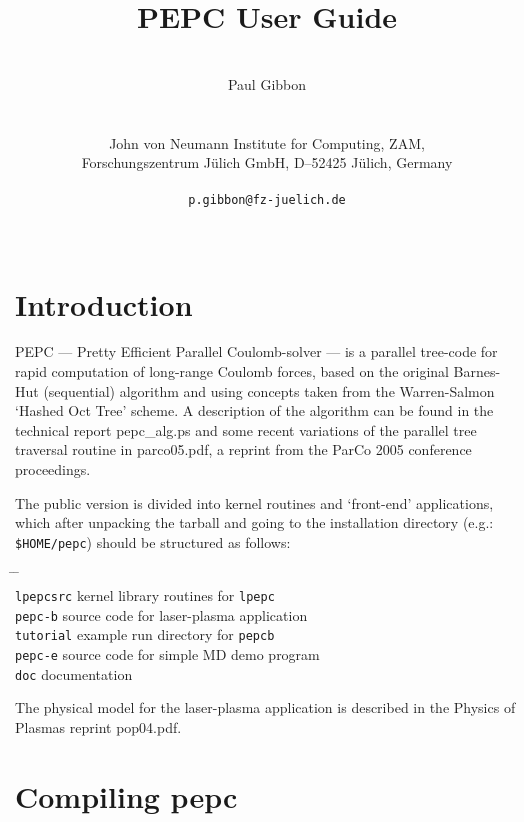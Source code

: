 \documentclass[12pt,psfig]{article}
\title{PEPC User Guide\\}
\author{\\ Paul Gibbon \\ \\ \\
John von Neumann Institute for Computing, ZAM,\\
Forschungszentrum J\"ulich GmbH, D--52425 J\"ulich, Germany\\ \\  {\tt p.gibbon@fz-juelich.de} \\\\
}
\begin{document}
\maketitle
\pagebreak

\begin{tableofcontents}
\end{tableofcontents}

\pagebreak

\section{Introduction}
\normalsize
PEPC --- Pretty Efficient Parallel Coulomb-solver --- is a parallel tree-code 
for rapid computation of long-range Coulomb forces, based on the original
Barnes-Hut (sequential) algorithm and using concepts taken from the
Warren-Salmon `Hashed Oct Tree' scheme.  A description of the algorithm can be
found in the technical report pepc\_alg.ps and some recent variations of the parallel tree
traversal routine in parco05.pdf, a reprint from the ParCo 2005 conference proceedings.

\medskip\noindent
The public version is divided into kernel routines and `front-end'
applications, which after unpacking the tarball and going to the installation
directory (e.g.: {\tt \$HOME/pepc}) should be structured as follows:
\begin{tabbing}
\hspace{1cm} \= \hspace{4cm} \= \hspace{1cm} \\
\> \texttt{lpepcsrc} \> kernel library routines for {\tt lpepc}\\
\> \texttt{pepc-b} \> source code for laser-plasma application \\
\> \texttt{tutorial} \> example run directory for {\tt pepcb}\\
\> \texttt{pepc-e} \> source code for simple MD demo program \\
\> \texttt{doc} \> documentation
\end{tabbing}

\noindent 
The physical model for the laser-plasma application is described in the Physics of Plasmas reprint pop04.pdf.


\section{Compiling {\sc pepc}} 
\end{document}
